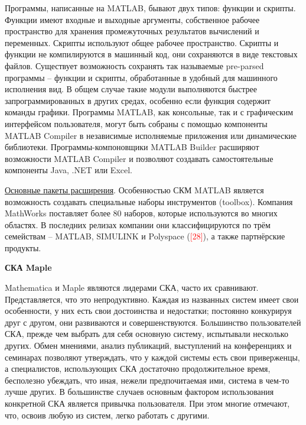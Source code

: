 Программы, написанные на MATLAB, бывают двух типов: функции и скрипты. Функции имеют входные и выходные аргументы, собственное рабочее пространство для хранения промежуточных результатов вычислений и переменных. Скрипты используют общее рабочее пространство. Скрипты и функции не компилируются в машинный код, они сохраняются в виде текстовых файлов. Существует возможность сохранять так называемые pre-parsed программы -- функции и скрипты, обработанные в удобный для машинного исполнения вид. В общем случае такие модули выполняются быстрее запрограммированных в других средах, особенно если функция содержит команды графики.
Программы MATLAB, как консольные, так и с графическим интерфейсом пользователя, могут быть собраны с помощью компоненты MATLAB Compiler в независимые исполняемые приложения или динамические библиотеки. Программы-компоновщики MATLAB Builder расширяют возможности MATLAB Compiler и позволяют создавать самостоятельные компоненты Java, .NET или Excel.

\underline{Основные пакеты расширения}.
Особенностью СКМ MATLAB является возможность создавать специальные наборы инструментов (toolbox). Компания MathWorks поставляет более 80 наборов, которые используются во многих областях. В последних релизах компании они классифицируются по трём семействам – MATLAB, SIMULINK и Polyspace (\textcolor{red}{[28]}), а также партнёрские продукты.

\textbf{СКА Maple}

Mathematica и Maple являются лидерами СКА, часто их сравнивают. Представляется, что это непродуктивно. Каждая из названных систем имеет свои особенности, у них есть свои достоинства и недостатки; постоянно конкурируя друг с другом, они развиваются и совершенствуются. Большинство пользователей СКА, прежде чем выбрать для себя основную систему, испытывали несколько других. Обмен мнениями, анализ публикаций, выступлений на конференциях и семинарах позволяют утверждать, что у каждой системы есть свои приверженцы, а специалистов, использующих СКА достаточно продолжительное время, бесполезно убеждать, что иная, нежели предпочитаемая ими, система в чем-то лучше других. В большинстве случаев основным фактором использования конкретной СКА является привычка пользователя. При этом многие отмечают, что, освоив любую из систем, легко работать с другими.


